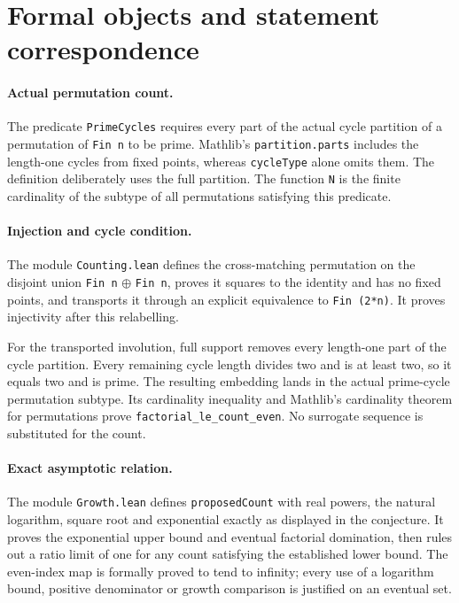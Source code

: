 \documentclass[11pt]{article}
\begin{document}
\clearpage
\section{Formal objects and statement correspondence}
\paragraph{Actual permutation count.}
The predicate \texttt{PrimeCycles} requires every part of the actual cycle partition of a permutation of \texttt{Fin n} to be prime. Mathlib's \texttt{partition.parts} includes the length-one cycles from fixed points, whereas \texttt{cycleType} alone omits them. The definition deliberately uses the full partition. The function \texttt{N} is the finite cardinality of the subtype of all permutations satisfying this predicate.

\paragraph{Injection and cycle condition.}
The module \texttt{Counting.lean} defines the cross-matching permutation on the disjoint union \texttt{Fin n} $\oplus$ \texttt{Fin n}, proves it squares to the identity and has no fixed points, and transports it through an explicit equivalence to \texttt{Fin (2*n)}. It proves injectivity after this relabelling.

For the transported involution, full support removes every length-one part of the cycle partition. Every remaining cycle length divides two and is at least two, so it equals two and is prime. The resulting embedding lands in the actual prime-cycle permutation subtype. Its cardinality inequality and Mathlib's cardinality theorem for permutations prove \texttt{factorial\_le\_count\_even}. No surrogate sequence is substituted for the count.

\paragraph{Exact asymptotic relation.}
The module \texttt{Growth.lean} defines \texttt{proposedCount} with real powers, the natural logarithm, square root and exponential exactly as displayed in the conjecture. It proves the exponential upper bound and eventual factorial domination, then rules out a ratio limit of one for any count satisfying the established lower bound. The even-index map is formally proved to tend to infinity; every use of a logarithm bound, positive denominator or growth comparison is justified on an eventual set.
\end{document}
